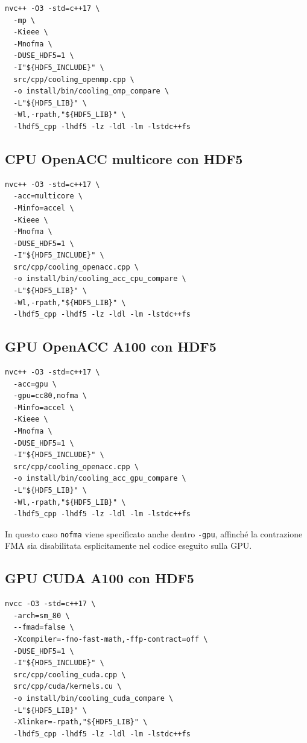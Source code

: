 \documentclass[11pt,a4paper]{article}
\begin{document}
\begin{lstlisting}[style=shell]
nvc++ -O3 -std=c++17 \
  -mp \
  -Kieee \
  -Mnofma \
  -DUSE_HDF5=1 \
  -I"${HDF5_INCLUDE}" \
  src/cpp/cooling_openmp.cpp \
  -o install/bin/cooling_omp_compare \
  -L"${HDF5_LIB}" \
  -Wl,-rpath,"${HDF5_LIB}" \
  -lhdf5_cpp -lhdf5 -lz -ldl -lm -lstdc++fs
\end{lstlisting}

\subsection{CPU OpenACC multicore con HDF5}

\begin{lstlisting}[style=shell]
nvc++ -O3 -std=c++17 \
  -acc=multicore \
  -Minfo=accel \
  -Kieee \
  -Mnofma \
  -DUSE_HDF5=1 \
  -I"${HDF5_INCLUDE}" \
  src/cpp/cooling_openacc.cpp \
  -o install/bin/cooling_acc_cpu_compare \
  -L"${HDF5_LIB}" \
  -Wl,-rpath,"${HDF5_LIB}" \
  -lhdf5_cpp -lhdf5 -lz -ldl -lm -lstdc++fs
\end{lstlisting}

\subsection{GPU OpenACC A100 con HDF5}

\begin{lstlisting}[style=shell]
nvc++ -O3 -std=c++17 \
  -acc=gpu \
  -gpu=cc80,nofma \
  -Minfo=accel \
  -Kieee \
  -Mnofma \
  -DUSE_HDF5=1 \
  -I"${HDF5_INCLUDE}" \
  src/cpp/cooling_openacc.cpp \
  -o install/bin/cooling_acc_gpu_compare \
  -L"${HDF5_LIB}" \
  -Wl,-rpath,"${HDF5_LIB}" \
  -lhdf5_cpp -lhdf5 -lz -ldl -lm -lstdc++fs
\end{lstlisting}

In questo caso \texttt{nofma} viene specificato anche dentro \texttt{-gpu},
affinché la contrazione FMA sia disabilitata esplicitamente nel codice
eseguito sulla GPU.

\subsection{GPU CUDA A100 con HDF5}

\begin{lstlisting}[style=shell]
nvcc -O3 -std=c++17 \
  -arch=sm_80 \
  --fmad=false \
  -Xcompiler=-fno-fast-math,-ffp-contract=off \
  -DUSE_HDF5=1 \
  -I"${HDF5_INCLUDE}" \
  src/cpp/cooling_cuda.cpp \
  src/cpp/cuda/kernels.cu \
  -o install/bin/cooling_cuda_compare \
  -L"${HDF5_LIB}" \
  -Xlinker=-rpath,"${HDF5_LIB}" \
  -lhdf5_cpp -lhdf5 -lz -ldl -lm -lstdc++fs
\end{lstlisting}
\end{document}
